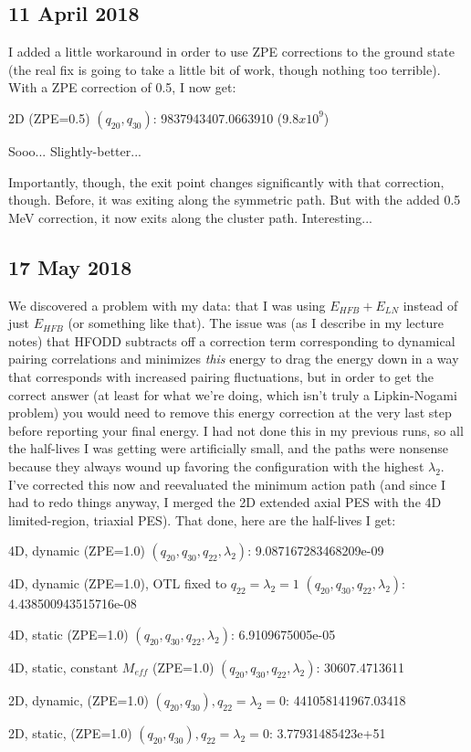 \subsection*{11 April 2018}
I added a little workaround in order to use ZPE corrections to the ground state (the real fix is going to take a little bit of work, though nothing too terrible). With a ZPE correction of 0.5, I now get:

\begin{list}{}{Half-life in 2 dimensions from Gogny, take 2:}
\item 2D (ZPE=0.5) $(q_{20},q_{30})$:        9837943407.0663910 ($9.8x10^9$)
\end{list}

Sooo... Slightly-better...

Importantly, though, the exit point changes significantly with that correction, though. Before, it was exiting along the symmetric path. But with the added 0.5 MeV correction, it now exits along the cluster path. Interesting...

\subsection*{17 May 2018}
We discovered a problem with my data: that I was using $E_{HFB}+E_{LN}$ instead of just $E_{HFB}$ (or something like that). The issue was (as I describe in my lecture notes) that HFODD subtracts off a correction term corresponding to dynamical pairing correlations and minimizes \textit{this} energy to drag the energy down in a way that corresponds with increased pairing fluctuations, but in order to get the correct answer (at least for what we're doing, which isn't truly a Lipkin-Nogami problem) you would need to remove this energy correction at the very last step before reporting your final energy. I had not done this in my previous runs, so all the half-lives I was getting were artificially small, and the paths were nonsense because they always wound up favoring the configuration with the highest $\lambda_2$. I've corrected this now and reevaluated the minimum action path (and since I had to redo things anyway, I merged the 2D extended axial PES with the 4D limited-region, triaxial PES). That done, here are the half-lives I get:

\begin{list}{}{Half-lives with correct treatment of Lipkin energy}
	\item 4D, dynamic (ZPE=1.0) $(q_{20},q_{30},q_{22},\lambda_2)$:        9.087167283468209e-09
	\item 4D, dynamic (ZPE=1.0), OTL fixed to $q_{22}=\lambda_2=1$ $(q_{20},q_{30},q_{22},\lambda_2)$:        4.438500943515716e-08
	\item 4D, static (ZPE=1.0) $(q_{20},q_{30},q_{22},\lambda_2)$:        6.9109675005e-05
	\item 4D, static, constant $M_{eff}$ (ZPE=1.0) $(q_{20},q_{30},q_{22},\lambda_2)$:        30607.4713611
	\item 2D, dynamic, (ZPE=1.0) $(q_{20},q_{30}), q_{22}=\lambda_2=0$:        441058141967.03418
	\item 2D, static, (ZPE=1.0) $(q_{20},q_{30}), q_{22}=\lambda_2=0$:        3.77931485423e+51
\end{list}

